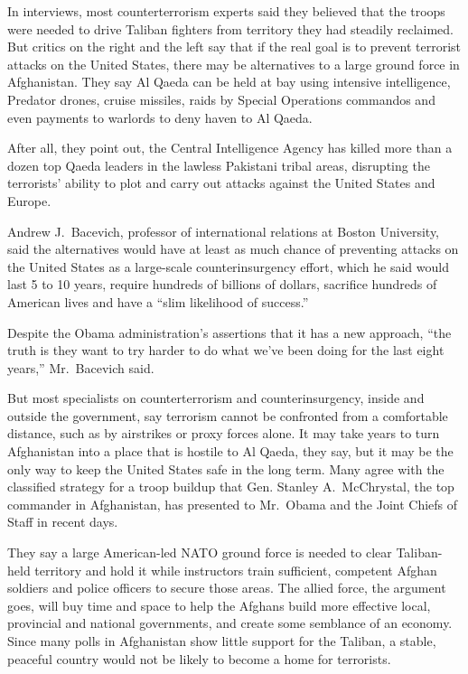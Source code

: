﻿\documentclass[12pt]{article}
\begin{document}
In interviews, most counterterrorism experts said they believed that the troops were needed to drive
Taliban fighters from territory they had steadily reclaimed. But critics on the right and the left
say that if the real goal is to prevent terrorist attacks on the United States, there may be
alternatives to a large ground force in Afghanistan. They say Al Qaeda can be held at bay using
intensive intelligence, Predator drones, cruise missiles, raids by Special Operations commandos and
even payments to warlords to deny haven to Al Qaeda.

After all, they point out, the Central Intelligence Agency has killed more than a dozen top Qaeda
leaders in the lawless Pakistani tribal areas, disrupting the terrorists' ability to plot and carry
out attacks against the United States and Europe.

Andrew J.~Bacevich, professor of international relations at Boston University, said the alternatives
would have at least as much chance of preventing attacks on the United States as a large-scale
counterinsurgency effort, which he said would last 5 to 10 years, require hundreds of billions of
dollars, sacrifice hundreds of American lives and have a ``slim likelihood of success.''

Despite the Obama administration's assertions that it has a new approach, ``the truth is they want
to try harder to do what we've been doing for the last eight years,'' Mr.~Bacevich said.

But most specialists on counterterrorism and counterinsurgency, inside and outside the government,
say terrorism cannot be confronted from a comfortable distance, such as by airstrikes or proxy
forces alone. It may take years to turn Afghanistan into a place that is hostile to Al Qaeda, they
say, but it may be the only way to keep the United States safe in the long term. Many agree with the
classified strategy for a troop buildup that Gen. Stanley A.~McChrystal, the top commander in
Afghanistan, has presented to Mr.~Obama and the Joint Chiefs of Staff in recent days.

They say a large American-led NATO ground force is needed to clear Taliban-held territory and hold
it while instructors train sufficient, competent Afghan soldiers and police officers to secure those
areas. The allied force, the argument goes, will buy time and space to help the Afghans build more
effective local, provincial and national governments, and create some semblance of an economy. Since
many polls in Afghanistan show little support for the Taliban, a stable, peaceful country would not
be likely to become a home for terrorists.
\end{document}
